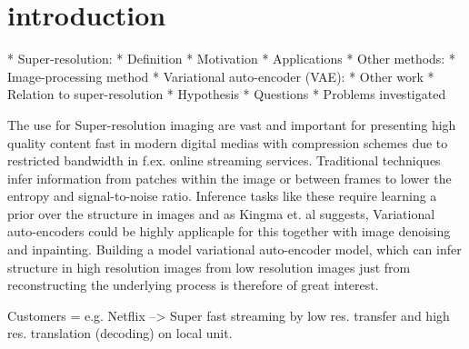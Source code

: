 \section{introduction}
\label{sec:introduction}

* Super-resolution:
	* Definition
	* Motivation
	* Applications
	* Other methods:
		* Image-processing method
* Variational auto-encoder (VAE):
	* Other work
	* Relation to super-resolution
		* Hypothesis
		* Questions
		* Problems investigated

The use for Super-resolution imaging are vast and important for presenting high quality content fast in modern digital medias with compression schemes due to restricted bandwidth in f.ex. online streaming services. Traditional techniques infer information from patches within the image or between frames to lower the entropy and signal-to-noise ratio.
	Inference tasks like these require learning a prior over the structure in images and as Kingma et. al \cite{Kingma2013} suggests, Variational auto-encoders could be highly applicaple for this together with image denoising and inpainting.
 Building a model variational auto-encoder model, which can infer structure in high resolution images from low resolution images just from reconstructing the underlying process is therefore of great interest.  

Customers = e.g. Netflix --> Super fast streaming by low res. transfer and high res. translation (decoding) on local unit. 